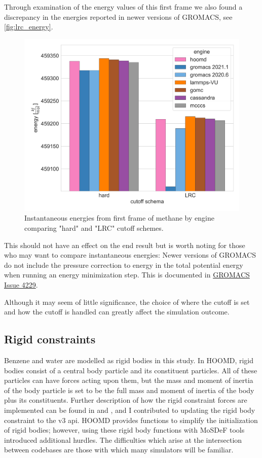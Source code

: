 Through examination of the energy values of this first frame we also found a discrepancy in the energies reported in newer versions of GROMACS, see \autoref{fig:lrc_energy}.
\begin{figure}[h!]
    \centering
    \includegraphics[width=0.6\linewidth,keepaspectratio]{figures/rep_study/lrc_energy.png}
    \caption{Instantaneous energies from first frame of methane by engine comparing "hard" and "LRC" cutoff schemes.}\label{fig:lrc_energy}
\end{figure}
This should not have an effect on the end result but is worth noting for those who may want to compare instantaneous energies:
Newer versions of GROMACS do not include the pressure correction to energy in the total potential energy when running an energy minimization step. 
This is documented in \href{https://gitlab.com/gromacs/gromacs/-/issues/4229}{GROMACS Issue 4229}.

Although it may seem of little significance, the choice of where the cutoff is set and how the cutoff is handled can greatly affect the simulation outcome.

\subsection{Rigid constraints}

Benzene and water are modelled as rigid bodies in this study.
In HOOMD, rigid bodies consist of a central body particle and its constituent particles. 
All of these particles can have forces acting upon them, but the mass and moment of inertia of the body particle is set to be the full mass and moment of inertia of the body plus its constituents.  
Further description of how the rigid constraint forces are implemented can be found in \citet{Nguyen2011a} and \citet{Glaser2020a}, and I contributed to updating the rigid body constraint to the v3 api.
HOOMD provides functions to simplify the initialization of rigid bodies; however, using these rigid body functions with MoSDeF tools introduced additional hurdles. 
The difficulties which arise at the intersection between codebases are those with which many simulators will be familiar.

